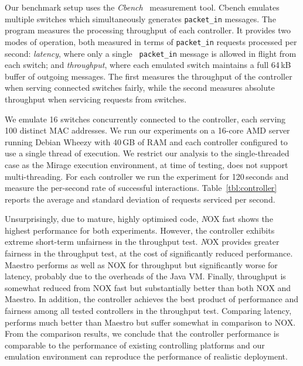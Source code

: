 Our benchmark setup uses the {\it Cbench}~\cite{cbench} measurement tool. Cbench
emulates multiple switches which simultaneously generates {\tt packet\_in}
messages.  The program measures the processing throughput of each controller.
It provides two modes of operation, both measured in terms of {\tt packet\_in}
requests processed per second: {\it latency}, where only a single {\tt
  packet\_in} message is allowed in flight from each switch; and {\it
  throughput}, where each emulated switch maintains a full 64\,kB buffer of
outgoing messages. The first measures the throughput of the controller
when serving connected switches fairly, while the second measures absolute
throughput when servicing requests from switches.
                                                                       
We emulate 16 switches concurrently connected to the controller, each serving
100 distinct MAC addresses. We run our experiments on a 16-core AMD server
running Debian Wheezy with 40\,GB of RAM and each controller configured to use a
single thread of execution. We restrict our analysis to the single-threaded case
as the Mirage execution environment, at time of testing, does not support
multi-threading. For each
controller we run the experiment for 120\,seconds and measure the per-second
rate of successful interactions. Table~\ref{tbl:controller} reports the average
and standard deviation of requests serviced per second.

Unsurprisingly, due to mature, highly optimised code, {\emph NOX fast} shows the
highest performance for both experiments. However, the controller exhibits
extreme short-term unfairness in the throughput test.  {\emph NOX} provides
greater fairness in the throughput test, at the cost of significantly reduced
performance. Maestro performs as well as NOX for throughput but significantly
worse for latency, probably due to the overheads of the Java VM\@.  Finally,
\mirage throughput is somewhat reduced from NOX fast but substantially better
than both NOX and Maestro. In addition, the \mirage controller achieves the best
product of performance and fairness among all tested controllers in the
throughput test.  Comparing latency, \mirage performs much better than Maestro
but suffer somewhat in comparison to NOX\@. From the comparison results, we
conclude that the \mirage controller performance is comparable to the
performance of existing controlling platforms and our emulation environment can
reproduce the performance of realistic \of deployment. 

